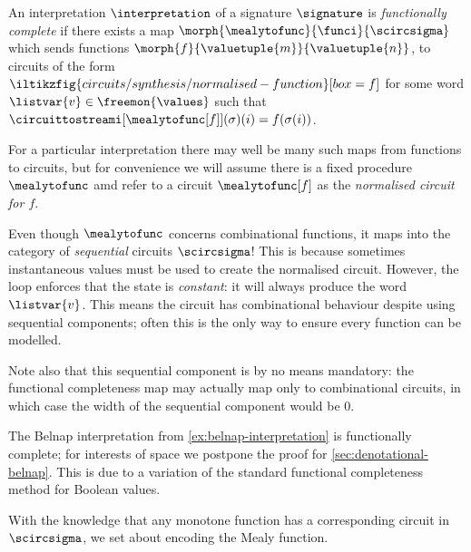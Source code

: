 \begin{definition}\label{def:functional-completeness}
    An interpretation \(\interpretation\) of a signature \(\signature\) is
    \emph{functionally complete} if there exists a map \(
    \morph{\mealytofunc}{\funci}{\scircsigma}
    \) which sends functions \(
    \morph{f}{\valuetuple{m}}{\valuetuple{n}}
    \), to circuits of the form \(
    \iltikzfig{circuits/synthesis/normalised-function}[box=f]
    \) for some word \(\listvar{v} \in \freemon{\values}\) such that
    \(\circuittostreami[\mealytofunc[f]](\sigma)(i) = f(\sigma(i))\).
\end{definition}

For a particular interpretation there may well be many such maps from functions
to circuits, but for convenience we will assume there is a fixed procedure
\(\mealytofunc\) amd refer to a circuit \(\mealytofunc[f]\) as the
\emph{normalised circuit for \(f\)}.\

\begin{remark}
    Even though \(\mealytofunc\) concerns combinational functions, it maps into
    the category of \emph{sequential} circuits \(\scircsigma\)!
    This is because sometimes instantaneous values must be used to create the
    normalised circuit.
    However, the loop enforces that the state is \emph{constant}: it will always
    produce the word \(\listvar{v}\).
    This means the circuit has combinational behaviour despite using sequential
    components; often this is the only way to ensure every function can be
    modelled.

    Note also that this sequential component is by no means mandatory: the
    functional completeness map may actually map only to combinational circuits,
    in which case the width of the sequential component would be \(0\).
\end{remark}

\begin{example}
    The Belnap interpretation from \cref{ex:belnap-interpretation} is
    functionally complete; for interests of space we postpone the proof for
    \cref{sec:denotational-belnap}.
    This is due to a variation of the standard functional
    completeness method for Boolean values.
\end{example}

With the knowledge that any monotone function has a corresponding circuit
in \(\scircsigma\), we set about encoding the Mealy function.

